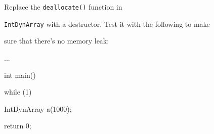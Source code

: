 Replace the \texttt{deallocate()} function in

\texttt{IntDynArray} with a destructor. Test it with the following to make

sure that there's no memory leak:



\begin{consolethree}[escapeinside=||]

...

int main()

{

    while (1)

    {

        IntDynArray a(1000);

    }

    return 0;

}

\end{consolethree}

